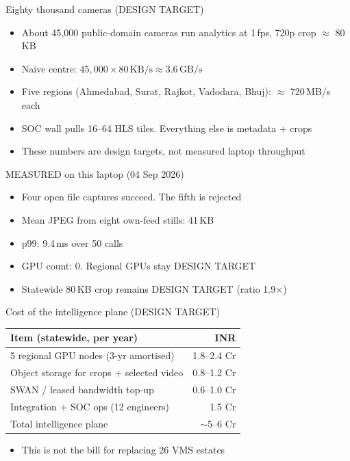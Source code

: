 \documentclass[aspectratio=169,11pt]{beamer}
\begin{document}
\begin{frame}{Eighty thousand cameras (DESIGN TARGET)}
\begin{itemize}\itemsep0.6em
\item About 45{,}000 public-domain cameras run analytics at 1\,fps, 720p crop $\approx$ 80\,KB
\item Naive centre: $45{,}000 \times 80\,\mathrm{KB/s} \approx 3.6\,\mathrm{GB/s}$
\item Five regions (Ahmedabad, Surat, Rajkot, Vadodara, Bhuj): $\approx$ 720\,MB/s each
\item SOC wall pulls 16--64 HLS tiles. Everything else is metadata + crops
\item These numbers are design targets, not measured laptop throughput
\end{itemize}
\end{frame}

\begin{frame}{MEASURED on this laptop (04 Sep 2026)}
\begin{itemize}\itemsep0.55em
\item Four open file captures succeed. The fifth is rejected
\item Mean JPEG from eight own-feed stills: 41\,KB
\item {} p99: 9.4\,ms over 50 calls
\item GPU count: 0. Regional GPUs stay DESIGN TARGET
\item Statewide 80\,KB crop remains DESIGN TARGET (ratio 1.9$\times$)
\end{itemize}
\end{frame}

\begin{frame}{Cost of the intelligence plane (DESIGN TARGET)}
\begin{center}
\begin{tabular}{@{}lr@{}}
\toprule
Item (statewide, per year) & INR \\
\midrule
5 regional GPU nodes (3-yr amortised) & 1.8--2.4 Cr \\
Object storage for crops + selected video & 0.8--1.2 Cr \\
SWAN / leased bandwidth top-up & 0.6--1.0 Cr \\
Integration + SOC ops (12 engineers) & 1.5 Cr \\
\midrule
Total intelligence plane & $\sim$5--6 Cr \\
\bottomrule
\end{tabular}
\end{center}
\medskip
\begin{itemize}\itemsep0.5em
\item This is not the bill for replacing 26 VMS estates
\end{itemize}
\end{frame}
\end{document}
